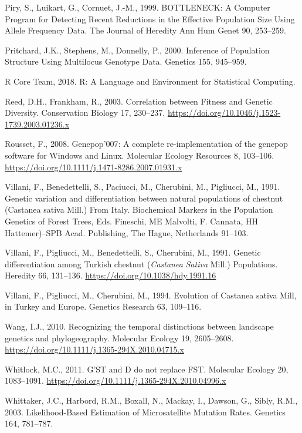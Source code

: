 \documentclass[12pt,a4paper,]{report}
\begin{document}
\leavevmode\hypertarget{ref-Piry1999}{}%
Piry, S., Luikart, G., Cornuet, J.-M., 1999. BOTTLENECK: A Computer
Program for Detecting Recent Reductions in the Effective Population Size
Using Allele Frequency Data. The Journal of Heredity Ann Hum Genet 90,
253--259.

\leavevmode\hypertarget{ref-pritchard_inference_2000}{}%
Pritchard, J.K., Stephens, M., Donnelly, P., 2000. Inference of
Population Structure Using Multilocus Genotype Data. Genetics 155,
945--959.

\leavevmode\hypertarget{ref-RCoreTeam2018}{}%
R Core Team, 2018. R: A Language and Environment for Statistical
Computing.

\leavevmode\hypertarget{ref-Reed2003}{}%
Reed, D.H., Frankham, R., 2003. Correlation between Fitness and Genetic
Diversity. Conservation Biology 17, 230--237.
\url{https://doi.org/10.1046/j.1523-1739.2003.01236.x}

\leavevmode\hypertarget{ref-Rousset2008}{}%
Rousset, F., 2008. Genepop'007: A complete re-implementation of the
genepop software for Windows and Linux. Molecular Ecology Resources 8,
103--106. \url{https://doi.org/10.1111/j.1471-8286.2007.01931.x}

\leavevmode\hypertarget{ref-villani1991genetic}{}%
Villani, F., Benedettelli, S., Paciucci, M., Cherubini, M., Pigliucci,
M., 1991. Genetic variation and differentiation between natural
populations of chestnut (Castanea sativa Mill.) From Italy. Biochemical
Markers in the Population Genetics of Forest Trees, Eds. Fineschi, ME
Malvolti, F. Cannata, HH Hattemer)--SPB Acad. Publishing, The Hague,
Netherlands 91--103.

\leavevmode\hypertarget{ref-Villani1991}{}%
Villani, F., Pigliucci, M., Benedettelli, S., Cherubini, M., 1991.
Genetic differentiation among Turkish chestnut (\emph{Castanea}
\emph{Sativa} Mill.) Populations. Heredity 66, 131--136.
\url{https://doi.org/10.1038/hdy.1991.16}

\leavevmode\hypertarget{ref-villani1994evolution}{}%
Villani, F., Pigliucci, M., Cherubini, M., 1994. Evolution of Castanea
sativa Mill, in Turkey and Europe. Genetics Research 63, 109--116.

\leavevmode\hypertarget{ref-Wang2010a}{}%
Wang, I.J., 2010. Recognizing the temporal distinctions between
landscape genetics and phylogeography. Molecular Ecology 19, 2605--2608.
\url{https://doi.org/10.1111/j.1365-294X.2010.04715.x}

\leavevmode\hypertarget{ref-whitlock_gst_2011}{}%
Whitlock, M.C., 2011. G'ST and D do not replace FST. Molecular Ecology
20, 1083--1091. \url{https://doi.org/10.1111/j.1365-294X.2010.04996.x}

\leavevmode\hypertarget{ref-whittaker_likelihood-based_2003}{}%
Whittaker, J.C., Harbord, R.M., Boxall, N., Mackay, I., Dawson, G.,
Sibly, R.M., 2003. Likelihood-Based Estimation of Microsatellite
Mutation Rates. Genetics 164, 781--787.
\end{document}
